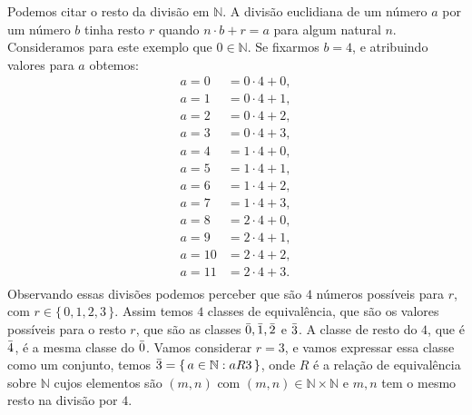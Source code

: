\documentclass[../main.tex]{subfiles}
\begin{document}
\begin{ex}\label{agb-ex-classeEquivalenciaDivisaoEuclidiana}
    Podemos citar o resto da divisão em $\mathbb{N}$. A divisão euclidiana de um número $a$ por um número $b$ tinha resto $r$ quando $n \cdot b + r = a$ para algum natural $n$. Consideramos para este exemplo que $0 \in \mathbb{N}$. Se fixarmos $b = 4$, e atribuindo valores para $a$ obtemos:
    \begin{align*}
        a = 0 &= 0 \cdot 4 + 0, \\
        a = 1 &= 0 \cdot 4 + 1, \\
        a = 2 &= 0 \cdot 4 + 2, \\
        a = 3 &= 0 \cdot 4 + 3, \\
        a = 4 &= 1 \cdot 4 + 0, \\
        a = 5 &= 1 \cdot 4 + 1, \\
        a = 6 &= 1 \cdot 4 + 2, \\
        a = 7 &= 1 \cdot 4 + 3, \\
        a = 8 &= 2 \cdot 4 + 0, \\
        a = 9 &= 2 \cdot 4 + 1, \\
        a = 10 &= 2 \cdot 4 + 2, \\
        a = 11 &= 2 \cdot 4 + 3. \\
    \end{align*}
    Observando essas divisões podemos perceber que são $4$ números possíveis para $r$, com $ r \in \{\,0,1,2,3\,\}$.
    Assim temos $4$ classes de equivalência, que são os valores possíveis para o resto $r$, que são as classes $\Bar{0}, \Bar{1}, \Bar{2}$ e $\Bar{3}$. A classe de resto do $4$, que é $\Bar{4}$, é a mesma classe do $\Bar{0}$. Vamos considerar $r=3$, e vamos expressar essa classe como um conjunto, temos $\Bar{3} = \{\,a \in \mathbb{N} : aR3\,\}$, onde $R$ é a relação de equivalência sobre $\mathbb{N}$ cujos elementos são $(m,n)$ com $(m,n) \in \mathbb{N} \times \mathbb{N}$ e $m,n$ tem o mesmo resto na divisão por $4$.
\end{ex}

\end{document}
